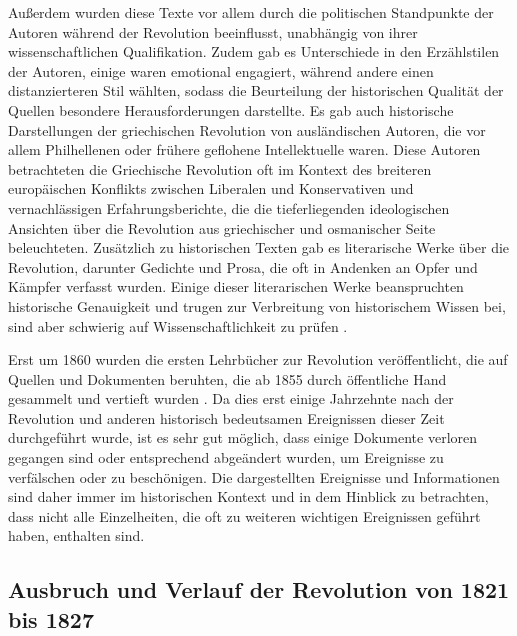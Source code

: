 \documentclass[preprint]{geomorphica} %
\begin{document}
Außerdem wurden diese Texte vor allem durch die politischen Standpunkte der Autoren während der Revolution beeinflusst, unabhängig von ihrer wissenschaftlichen Qualifikation.
Zudem gab es Unterschiede in den Erzählstilen der Autoren, einige waren emotional engagiert, während andere einen distanzierteren Stil wählten, sodass die Beurteilung der historischen Qualität der Quellen besondere Herausforderungen darstellte. 
Es gab auch historische Darstellungen der griechischen Revolution von ausländischen Autoren, die vor allem Philhellenen oder frühere geflohene Intellektuelle waren.
Diese Autoren betrachteten die Griechische Revolution oft im Kontext des breiteren europäischen Konflikts zwischen Liberalen und Konservativen und vernachlässigen Erfahrungsberichte, die die tieferliegenden ideologischen Ansichten über die Revolution aus griechischer und osmanischer Seite beleuchteten. 
Zusätzlich zu historischen Texten gab es literarische Werke über die Revolution, darunter Gedichte und Prosa, die oft in Andenken an Opfer und Kämpfer verfasst wurden.
Einige dieser literarischen Werke beanspruchten historische Genauigkeit und trugen zur Verbreitung von historischem Wissen bei, sind aber schwierig auf Wissenschaftlichkeit zu prüfen \cite{Stathis2021}.

Erst um 1860 wurden die ersten Lehrbücher zur Revolution veröffentlicht, die auf Quellen und Dokumenten beruhten, die ab 1855 durch öffentliche Hand gesammelt und vertieft wurden \cite{Stathis2021}.
Da dies erst einige Jahrzehnte nach der Revolution und anderen historisch bedeutsamen Ereignissen dieser Zeit durchgeführt wurde, ist es sehr gut möglich, dass einige Dokumente verloren gegangen sind oder entsprechend abgeändert wurden, um Ereignisse zu verfälschen oder zu beschönigen. 
Die dargestellten Ereignisse und Informationen sind daher immer im historischen Kontext und in dem Hinblick zu betrachten, dass nicht alle Einzelheiten, die oft zu weiteren wichtigen Ereignissen geführt haben, enthalten sind.

\subsection{Ausbruch und Verlauf der Revolution von 1821 bis 1827}
\end{document}
